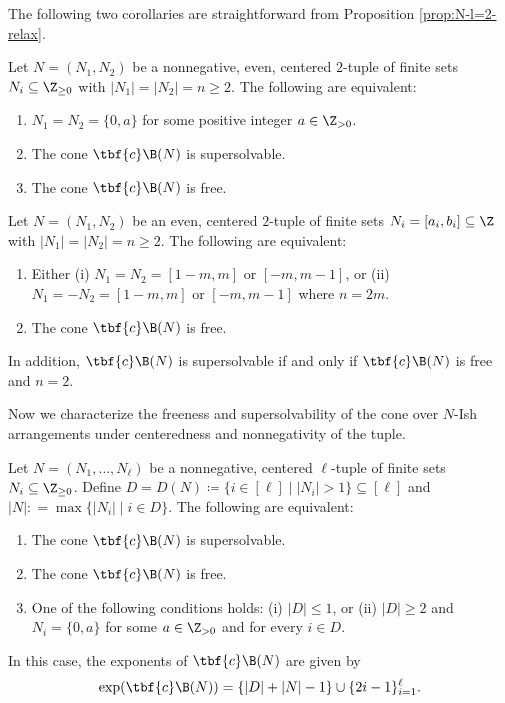 The following two corollaries are straightforward from Proposition \ref{prop:N-l=2-relax}.
 \begin{corollary}
 \label{cor:N-l=2-nonnegative}
 Let $N = (N_1, N_2)$ be  a nonnegative, even, centered $2$-tuple  of finite sets $N_i \subseteq \Z_{\ge0}$  with $|N_1| = |N_2|=n \ge 2$.
 The following are equivalent:
 \begin{enumerate}[(1)]
\item $N_1 = N_2 =\{0,a\}$ for some positive integer $a \in \Z_{>0}$.
\item  The cone $\tbf{c}\B(N)$ is supersolvable.
\item The cone $\tbf{c}\B(N)$  is  free.
\end{enumerate}
\end{corollary}

 \begin{corollary}
 \label{cor:N-l=2-integral}
 Let $N = (N_1, N_2)$ be  an even, centered $2$-tuple  of finite sets $N_i =[a_i,b_i] \subseteq \Z$ with $|N_1| = |N_2|=n \ge 2$.
 The following are equivalent:
 \begin{enumerate}[(1)]
\item Either (i) $N_1 = N_2 =[1-m,m]$ or $[-m,m-1]$, or (ii) $N_1 = -N_2 =[1-m,m]$ or $[-m,m-1]$ where $n=2m$.
\item The cone $\tbf{c}\B(N)$  is  free.
\end{enumerate}
In addition, $\tbf{c}\B(N)$ is supersolvable if and only if $\tbf{c}\B(N)$ is free and $n= 2$. 
\end{corollary}




Now we characterize the freeness and supersolvability of the cone over $N$-Ish arrangements under centeredness and nonnegativity of  the tuple.


 \begin{theorem}
 \label{thm:N-Ish-B-free-SS-relax}
 Let $N = (N_1, \ldots, N_\ell)$ be a nonnegative, centered $\ell$-tuple  of finite sets $N_i \subseteq \Z_{\ge0}$. 
 Define $D=D(N) \coloneqq  \{i \in [\ell] \mid |N_i|>1\} \subseteq  [\ell]$ and $|N|: = \max \{  |N_i| \mid i \in D\}$.
 The following are equivalent:
 \begin{enumerate}[(1)]
\item  The cone $\tbf{c}\B(N)$ is supersolvable.
\item The cone $\tbf{c}\B(N)$  is  free.
\item One of the following conditions holds: (i) $| D | \le 1 $, or (ii)  $|D|\ge 2$ and $N_i= \{0,a\}$ for some $a \in \Z_{>0}$ and for every $i \in D$. 
\end{enumerate}
In this case, the exponents of  $\tbf{c}\B(N)$ are given by 
$$\exp(\tbf{c}\B(N)) = \{|D|+|N| -1\} \cup \{2i-1\}_{i=1}^\ell.$$ 
 \end{theorem}
 
